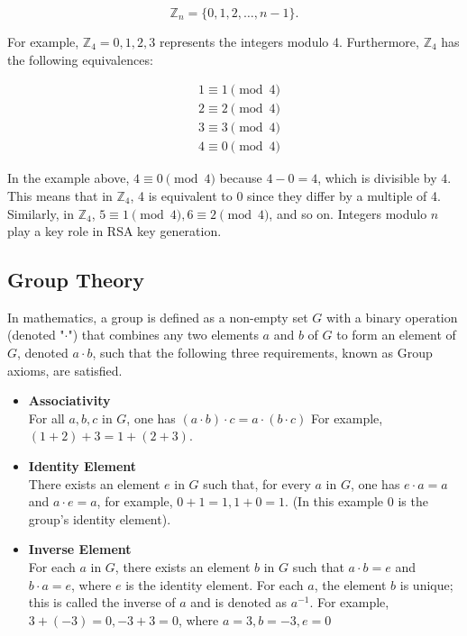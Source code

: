 $$
\mathbb{Z}_n = \{ 0,1,2, \ldots, n-1 \}.
$$

For example, $\mathbb{Z}_4 = {0,1,2,3}$ represents the integers modulo 4. Furthermore, $\mathbb{Z}_4$ has the following equivalences:

\[
\begin{aligned}
&1 \equiv 1 \pmod{4} \\
&2 \equiv 2 \pmod{4} \\
&3 \equiv 3 \pmod{4} \\
&4 \equiv 0 \pmod{4}
\end{aligned}
\]

In the example above, $4 \equiv 0 \pmod{4}$ because $4-0 = 4$, which is divisible by $4$. This means that in $\mathbb{Z}_4$, 4 is equivalent to 0 since they differ by a multiple of 4. Similarly, in $\mathbb{Z}_4$, $5 \equiv 1 \pmod{4}, 6 \equiv 2 \pmod{4}$, and so on. Integers modulo $n$ play a key role in RSA key generation.



\subsection{Group Theory}\label{sec:section2.2}

In mathematics, a group is defined as a non-empty set $G$ with a binary operation (denoted "$\cdot$") that combines any two elements $a$ and $b$ of $G$ to form an element of $G$, denoted $a \cdot b$, such that the following three requirements, known as Group axioms, are satisfied. 

\begin{itemize}
    \item \textbf{Associativity} \\
    For all $a,b,c$ in $G$, one has $(a \cdot b) \cdot c = a \cdot (b \cdot c)$ For example, $(1 + 2) + 3 = 1 + (2 + 3)$.
  \end{itemize}

  \begin{itemize}
    \item \textbf{Identity Element} \\
    There exists an element $e$ in $G$ such that, for every $a$ in $G$, one has $e \cdot a = a$ and $a \cdot e = a$, for example, $0 + 1 = 1, 1+ 0 = 1$. (In this example 0 is the group’s identity element).
  \end{itemize}

  \begin{itemize}
    \item \textbf{Inverse Element} \\
    For each $a$ in $G$, there exists an element $b$ in $G$ such that $a \cdot b = e$ and $b \cdot a = e$, where $e$ is the identity element. For each $a$, the element $b$ is unique; this is called the inverse of $a$ and is denoted as $a^{-1}$.  For example, $3 + (-3) = 0, -3 + 3 = 0$, where $a = 3, b=-3, e= 0$
  \end{itemize}
  
